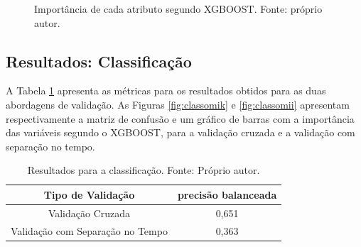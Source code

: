 \begin{figure}[h]
\center
{}
\caption{Importância de cada atributo segundo XGBOOST. Fonte: próprio autor.}\label{fig:rego}
\end{figure}


\subsection{Resultados: Classificação}

A Tabela \ref{tab:results_class} apresenta as métricas para os resultados obtidos para as duas abordagens de validação. As Figuras \ref{fig:classomik} e \ref{fig:classomii} apresentam respectivamente a matriz de confusão e um gráfico de barras com a importância das variáveis segundo o XGBOOST, para a validação cruzada e a validação com separação no tempo.

\begin{table}[h]
\begin{center}
\begin{tabular}{|c|c|}
\hline
Tipo de Validação & precisão balanceada   \\ \hline
Validação Cruzada                   & 0,651    \\ \hline
Validação com Separação no Tempo    & 0,363     \\ \hline
\end{tabular}
\end{center}
\vspace{12pt}
\caption{Resultados para a classificação. Fonte: Próprio autor.}
\label{tab:results_class}
\end{table}

